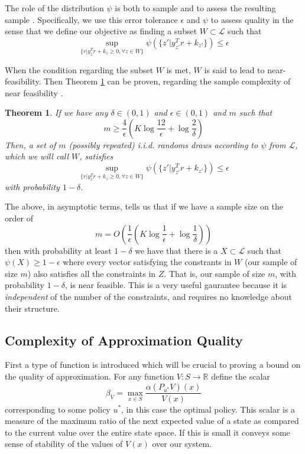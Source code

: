 \documentclass[12pt,reqno]{amsart}
\newtheorem{thm}{Theorem}[section]
\newcommand{\R}{\ensuremath{\mathbb{R}}}
\newcommand{\sL}{\mathcal{L}}
\numberwithin{equation}{section}
\begin{document}
The role of the distribution $\psi$ is both to sample and to assess the resulting sample \cite{FV2}. Specifically, we use this error tolerance $\epsilon$ and $\psi$ to assess quality in the sense that we define our objective as finding a subset $W \subset \sL$ such that
$$
\sup_{\{r | y_z^Tr + k_z \geq 0, \forall z \in W\}} \psi(\{ z' | y_{z'}^T r + k_{z'}\}) \leq \epsilon
$$

When the condition regarding the subset $W$ is met, $W$ is said to lead to near-feasibility. Then Theorem \ref{thm:sample_complexity} can be proven, regarding the sample complexity of near feasibility \cite{FV2}.

\begin{thm}\label{thm:sample_complexity}
If we have any $\delta \in (0,1)$ and $\epsilon \in (0,1)$ and $m$ such that
$$
m \geq \frac{4}{\epsilon} (K \log \frac{12}{\epsilon} + \log \frac{2}{\delta})
$$
Then, a set of $m$ (possibly repeated) i.i.d. randoms draws according to $\psi$ from $\sL$, which we will call $W$, satisfies
$$
\sup_{\{r | y_z^Tr + k_z \geq 0, \forall z \in W\}} \psi(\{ z' | y_{z'}^T r + k_{z'}\}) \leq \epsilon
$$ 
with probability $1-\delta$.
\end{thm}

The above, in asymptotic terms, tells us that if we have a sample size on the order of
$$
m = O(\frac{1}{\epsilon}(K \log \frac{1}{\epsilon} + \log \frac{1}{\delta}))
$$
then with probability at least $1-\delta$ we have that there is a $X \subset \sL$ such that $\psi(X) \geq 1 - \epsilon$ where every vector satisfying the constrants in $W$ (our sample of size $m$) also satisfies all the constraints in $Z$. That is, our sample of size $m$, with probability $1- \delta$, is near feasible. This is a very useful gaurantee because it is {\em independent} of the number of the constraints, and requires no knowledge about their structure.

\subsection{Complexity of Approximation Quality}
First a type of function is introduced which will be crucial to proving a bound on the quality of approximation. For any function $V: S \rightarrow \R$ define the scalar
$$
\beta_V = \max_{x \in S} \frac{\alpha(P_{u^*}V)(x)}{V(x)}
$$
corresponding to some policy $u^*$, in this case the optimal policy. This scalar is a measure of the maximum ratio of the next expected value of a state as compared to the current value over the entire state space. If this is small it conveys some sense of stability of the values of $V(x)$ over our system.
\end{document}
